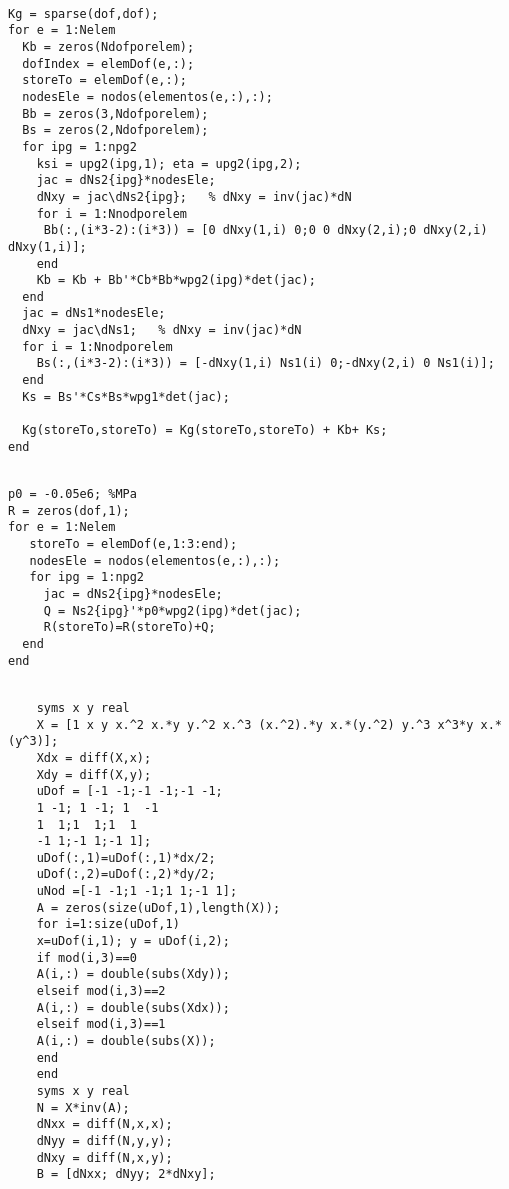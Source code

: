 \begin{code}
	\begin{verbatim}
	
Kg = sparse(dof,dof);
for e = 1:Nelem
  Kb = zeros(Ndofporelem);
  dofIndex = elemDof(e,:);
  storeTo = elemDof(e,:);
  nodesEle = nodos(elementos(e,:),:);
  Bb = zeros(3,Ndofporelem);
  Bs = zeros(2,Ndofporelem);
  for ipg = 1:npg2
    ksi = upg2(ipg,1); eta = upg2(ipg,2);
    jac = dNs2{ipg}*nodesEle;
    dNxy = jac\dNs2{ipg};   % dNxy = inv(jac)*dN
    for i = 1:Nnodporelem 
     Bb(:,(i*3-2):(i*3)) = [0 dNxy(1,i) 0;0 0 dNxy(2,i);0 dNxy(2,i) dNxy(1,i)];
    end
    Kb = Kb + Bb'*Cb*Bb*wpg2(ipg)*det(jac);
  end
  jac = dNs1*nodesEle;
  dNxy = jac\dNs1;   % dNxy = inv(jac)*dN
  for i = 1:Nnodporelem 
    Bs(:,(i*3-2):(i*3)) = [-dNxy(1,i) Ns1(i) 0;-dNxy(2,i) 0 Ns1(i)];
  end
  Ks = Bs'*Cs*Bs*wpg1*det(jac);

  Kg(storeTo,storeTo) = Kg(storeTo,storeTo) + Kb+ Ks;
end
	\end{verbatim}
\end{code}




\begin{code}[Cargas]
	\begin{verbatim}
	
p0 = -0.05e6; %MPa
R = zeros(dof,1);
for e = 1:Nelem
   storeTo = elemDof(e,1:3:end);
   nodesEle = nodos(elementos(e,:),:);
   for ipg = 1:npg2
     jac = dNs2{ipg}*nodesEle;
     Q = Ns2{ipg}'*p0*wpg2(ipg)*det(jac);
     R(storeTo)=R(storeTo)+Q;
  end
end
	\end{verbatim}
\end{code}

    \begin{code}
	\begin{verbatim}
	
	syms x y real
	X = [1 x y x.^2 x.*y y.^2 x.^3 (x.^2).*y x.*(y.^2) y.^3 x^3*y x.*(y^3)];
	Xdx = diff(X,x);
	Xdy = diff(X,y);
	uDof = [-1 -1;-1 -1;-1 -1;
	1 -1; 1 -1; 1  -1
	1  1;1  1;1  1
	-1 1;-1 1;-1 1];
	uDof(:,1)=uDof(:,1)*dx/2;
	uDof(:,2)=uDof(:,2)*dy/2;
	uNod =[-1 -1;1 -1;1 1;-1 1];
	A = zeros(size(uDof,1),length(X));
	for i=1:size(uDof,1)
	x=uDof(i,1); y = uDof(i,2);
	if mod(i,3)==0
	A(i,:) = double(subs(Xdy));
	elseif mod(i,3)==2
	A(i,:) = double(subs(Xdx));
	elseif mod(i,3)==1
	A(i,:) = double(subs(X));
	end
	end
	syms x y real
	N = X*inv(A);
	dNxx = diff(N,x,x);
	dNyy = diff(N,y,y);
	dNxy = diff(N,x,y);
	B = [dNxx; dNyy; 2*dNxy];
	\end{verbatim}
\end{code}

